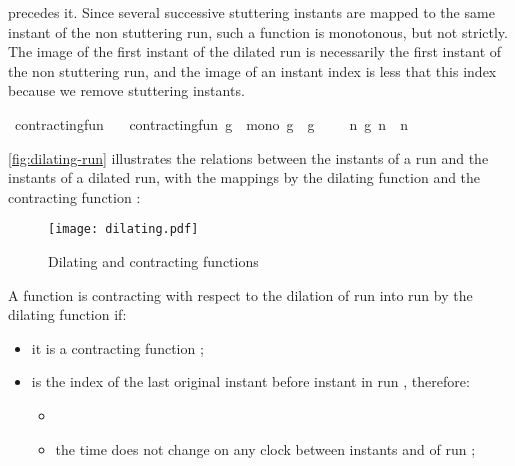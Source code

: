 \begin{isabellebody}
\begin{isamarkuptext}
  precedes it. Since several successive stuttering instants are mapped to the same
  instant of the non stuttering run, such a function is monotonous, but not strictly.
  The image of the first instant of the dilated run is necessarily the first instant
  of the non stuttering run, and the image of an instant index is less that this 
  index because we remove stuttering instants.%
\end{isamarkuptext}\isamarkuptrue%
\isamarkupfalse%
\ contracting{\isacharunderscore}fun\isanewline
\ \ \ {\isacartoucheopen}contracting{\isacharunderscore}fun\ g\ {\isasymequiv}\ mono\ g\ {\isasymand}\ g\ {}\ {\isacharequal}\ {}\ {\isasymand}\ {\isacharparenleft}{\isasymforall}n{\isachardot}\ g\ n\ {\isasymle}\ n{\isacharparenright}{\isacartoucheclose}%
\begin{isamarkuptext}%
\autoref{fig:dilating-run} illustrates the relations between the instants of 
  a run and the instants of a dilated run, with the mappings by the dilating 
  function  and the contracting function :
  \begin{figure}
    \centering
    \texttt{[image: dilating.pdf]}
    \caption{Dilating and contracting functions}\label{fig:dilating-run}
  \end{figure}%
\end{isamarkuptext}\isamarkuptrue%
%
\begin{isamarkuptext}%
A function  is contracting with respect to the dilation of run
 into run  by the dilating function  if:

%
\begin{itemize}%
\item it is a contracting function ;

\item {} is the index of the last original instant before instant 
 in run , therefore:

%
\begin{itemize}%
\item {}

\item the time does not change on any clock between instants 
and  of run ;


\end{itemize}
\end{itemize}
\end{isamarkuptext}
\end{isabellebody}
